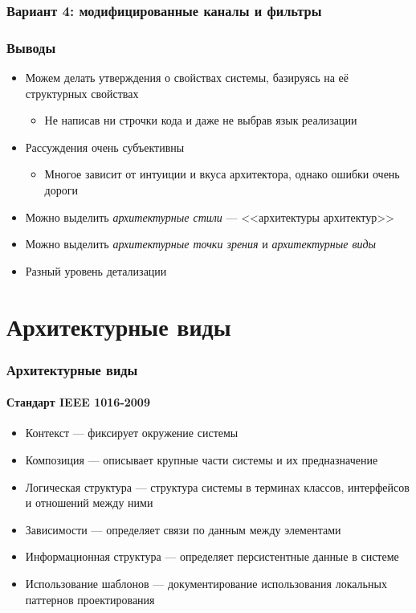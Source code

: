 \documentclass{../cscslides}
\begin{document}
    \begin{frame}
        \frametitle{Вариант 4: модифицированные каналы и фильтры}
    \end{frame}

    \begin{frame}
        \frametitle{Выводы}
        \begin{itemize}
            \item Можем делать утверждения о свойствах системы, базируясь на её структурных свойствах
            \begin{itemize}
                \item Не написав ни строчки кода и даже не выбрав язык реализации
            \end{itemize}
            \item Рассуждения очень субъективны
            \begin{itemize}
                \item Многое зависит от интуиции и вкуса архитектора, однако ошибки очень дороги
            \end{itemize}
            \item Можно выделить \emph{архитектурные стили} --- <<архитектуры архитектур>>
            \item Можно выделить \emph{архитектурные точки зрения} и \emph{архитектурные виды}
            \item Разный уровень детализации
        \end{itemize}
    \end{frame}

    \section{Архитектурные виды}

    \begin{frame}
        \frametitle{Архитектурные виды}
        \framesubtitle{Стандарт IEEE 1016-2009}
        \begin{itemize}
            \item Контекст --- фиксирует окружение системы
            \item Композиция --- описывает крупные части системы и их предназначение
            \item Логическая структура --- структура системы в терминах классов, интерфейсов и отношений между ними
            \item Зависимости --- определяет связи по данным между элементами
            \item Информационная структура --- определяет персистентные данные в системе
            \item Использование шаблонов --- документирование использования локальных паттернов проектирования
        \end{itemize}
    \end{frame}
\end{document}
